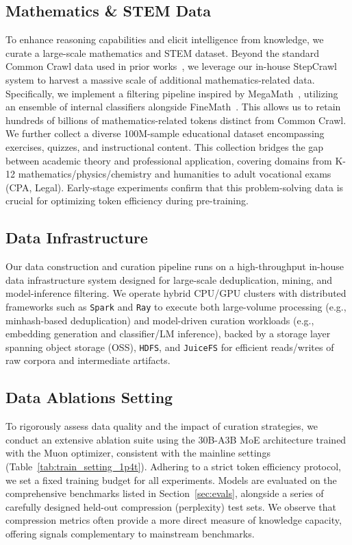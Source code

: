 \subsection{Mathematics \& STEM Data}

To enhance reasoning capabilities and elicit intelligence from knowledge, we curate a large-scale mathematics and STEM dataset.
Beyond the standard Common Crawl data used in prior works~\cite{shao2024deepseekmathpushinglimitsmathematical,zhou2025megamathpushinglimitsopen}, we leverage our in-house {StepCrawl} system to harvest a massive scale of additional mathematics-related data.
Specifically, we implement a filtering pipeline inspired by MegaMath~\cite{zhou2025megamathpushinglimitsopen}, utilizing an ensemble of internal classifiers alongside FineMath~\cite{allal2025smollm2smolgoesbig}.
This allows us to retain hundreds of billions of mathematics-related tokens distinct from Common Crawl.
We further collect a diverse 100M-sample educational dataset encompassing exercises, quizzes, and instructional content.
This collection bridges the gap between academic theory and professional application, covering domains from K-12 mathematics/physics/chemistry and humanities to adult vocational exams (CPA, Legal).
Early-stage experiments confirm that this problem-solving data is crucial for optimizing token efficiency during pre-training.


\subsection{Data Infrastructure}
\label{sec:data-infra}

\noindent Our data construction and curation pipeline runs on a high-throughput in-house data infrastructure system designed for large-scale deduplication, mining, and model-inference filtering.
We operate hybrid CPU/GPU clusters with distributed frameworks such as \texttt{Spark} and \texttt{Ray} to execute both large-volume processing (e.g., minhash-based deduplication) and model-driven curation workloads (e.g., embedding generation and classifier/LM inference), backed by a storage layer spanning object storage (OSS), \texttt{HDFS}, and \texttt{JuiceFS} for efficient reads/writes of raw corpora and intermediate artifacts.


\subsection{Data Ablations Setting}

To rigorously assess data quality and the impact of curation strategies, we conduct an extensive ablation suite using the 30B-A3B MoE architecture trained with the Muon optimizer, consistent with the mainline settings (Table~\ref{tab:train_setting_1p4t}).
Adhering to a strict token efficiency protocol, we set a fixed training budget for all experiments.
Models are evaluated on the comprehensive benchmarks listed in Section~\ref{sec:evals}, alongside a series of carefully designed held-out compression (perplexity) test sets.
We observe that compression metrics often provide a more direct measure of knowledge capacity, offering signals complementary to mainstream benchmarks.

